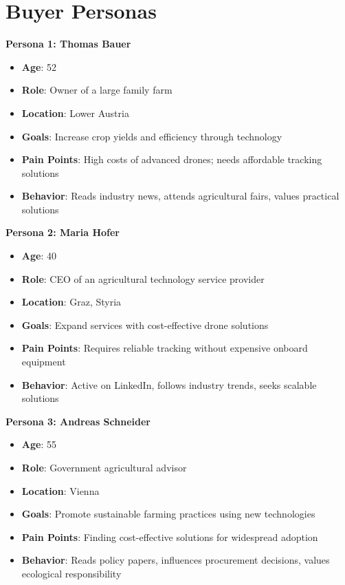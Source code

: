 \section{Buyer Personas}

\textbf{Persona 1: Thomas Bauer}

\begin{itemize} \item \textbf{Age}: 52 \item \textbf{Role}: Owner of a large family farm \item \textbf{Location}: Lower Austria \item \textbf{Goals}: Increase crop yields and efficiency through technology \item \textbf{Pain Points}: High costs of advanced drones; needs affordable tracking solutions \item \textbf{Behavior}: Reads industry news, attends agricultural fairs, values practical solutions \end{itemize}

\textbf{Persona 2: Maria Hofer}

\begin{itemize} \item \textbf{Age}: 40 \item \textbf{Role}: CEO of an agricultural technology service provider \item \textbf{Location}: Graz, Styria \item \textbf{Goals}: Expand services with cost-effective drone solutions \item \textbf{Pain Points}: Requires reliable tracking without expensive onboard equipment \item \textbf{Behavior}: Active on LinkedIn, follows industry trends, seeks scalable solutions \end{itemize}

\textbf{Persona 3: Andreas Schneider}

\begin{itemize} \item \textbf{Age}: 55 \item \textbf{Role}: Government agricultural advisor \item \textbf{Location}: Vienna \item \textbf{Goals}: Promote sustainable farming practices using new technologies \item \textbf{Pain Points}: Finding cost-effective solutions for widespread adoption \item \textbf{Behavior}: Reads policy papers, influences procurement decisions, values ecological responsibility \end{itemize}

